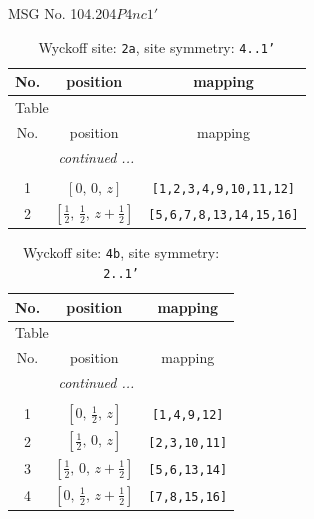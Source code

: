 \documentclass[fleqn,8pt]{jsarticle}
\begin{document}
\setcounter{MaxMatrixCols}{32}

\renewcommand{\tablename}{Table~}
\renewcommand{\figurename}{Figure~}
\begin{center}
\LARGE
MSG No. 104.204\quad$P4nc1'$
\end{center}
\renewcommand{\arraystretch}{1.2}
\begin{longtable}{ccc}
\caption{Wyckoff site: {\tt 2a}, site symmetry: {\tt 4..1'}}
 \\
 \hline \hline
No. & position & mapping \\ \hline \endfirsthead

\multicolumn{2}{l}{\tablename\ \thetable{}} \\
 \hline \hline
No. & position & mapping \\ \hline \endhead

 \hline \hline
\multicolumn{2}{r}{\footnotesize\it continued ...} \\ \endfoot

 \hline \hline
\multicolumn{2}{r}{} \\ \endlastfoot

1 & $\left[ 0,\, 0,\, z \right]$ & {\tt [1,2,3,4,9,10,11,12]} \\ \hline
2 & $\left[ \frac{1}{2},\, \frac{1}{2},\, z + \frac{1}{2} \right]$ & {\tt [5,6,7,8,13,14,15,16]} \\
\end{longtable}
\renewcommand{\arraystretch}{1.2}
\begin{longtable}{ccc}
\caption{Wyckoff site: {\tt 4b}, site symmetry: {\tt 2..1'}}
 \\
 \hline \hline
No. & position & mapping \\ \hline \endfirsthead

\multicolumn{2}{l}{\tablename\ \thetable{}} \\
 \hline \hline
No. & position & mapping \\ \hline \endhead

 \hline \hline
\multicolumn{2}{r}{\footnotesize\it continued ...} \\ \endfoot

 \hline \hline
\multicolumn{2}{r}{} \\ \endlastfoot

1 & $\left[ 0,\, \frac{1}{2},\, z \right]$ & {\tt [1,4,9,12]} \\ \hline
2 & $\left[ \frac{1}{2},\, 0,\, z \right]$ & {\tt [2,3,10,11]} \\ \hline
3 & $\left[ \frac{1}{2},\, 0,\, z + \frac{1}{2} \right]$ & {\tt [5,6,13,14]} \\ \hline
4 & $\left[ 0,\, \frac{1}{2},\, z + \frac{1}{2} \right]$ & {\tt [7,8,15,16]} \\
\end{longtable}
\end{document}
